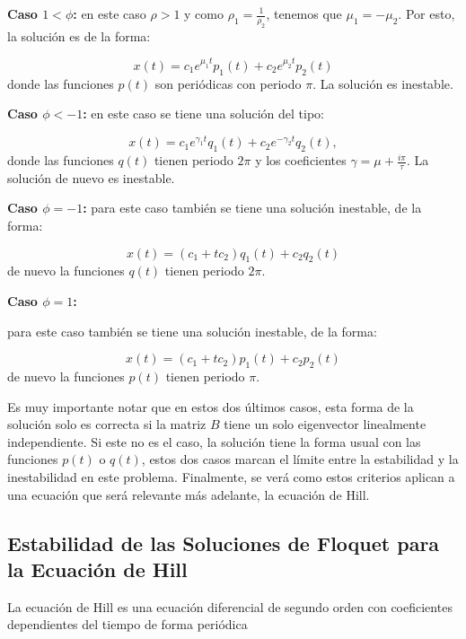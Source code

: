 \documentclass[10pt,a4paper]{report}
\begin{document}
\textbf{Caso $1 < \phi$:} en este caso $\rho > 1$ y como $\rho_1 = \frac{1}{\rho_2}$, tenemos que $\mu_1 = -\mu_2$. Por esto, la solución es de la forma:

\begin{equation}
x(t) = c_1 e^{\mu_1 t}p_1(t) + c_2 e^{\mu_2 t}p_2(t)
\end{equation} donde las funciones $p(t)$ son periódicas con periodo $\pi$. La solución es inestable.

\textbf{Caso $\phi < -1$:} en este caso se tiene una solución del tipo:

\begin{equation}
x(t) =c_1 e^{\gamma_1 t}q_1(t) + c_2 e^{-\gamma_2 t}q_2(t),
\end{equation} donde las funciones $q(t)$ tienen periodo $2\pi$ y los coeficientes $\gamma = \mu + \frac{i\pi}{\tau}$. La solución de nuevo es inestable.

\textbf{Caso $\phi = -1$:} para este caso también se tiene una solución inestable, de la forma:

\begin{equation}
x(t) = (c_1 + tc_2)q_1(t) + c_2q_2(t)
\end{equation} de nuevo la funciones $q(t)$ tienen periodo $2\pi$.

\textbf{Caso $\phi = 1$:}

para este caso también se tiene una solución inestable, de la forma:

\begin{equation}
x(t) = (c_1 + tc_2)p_1(t) + c_2p_2(t)
\end{equation} de nuevo la funciones $p(t)$ tienen periodo $\pi$.

Es muy importante notar que en estos dos últimos casos, esta forma de la solución solo es correcta si la matriz $B$ tiene un solo eigenvector linealmente independiente. Si este no es el caso, la solución tiene la forma usual con las funciones $p(t)$ o $q(t)$, estos dos casos marcan el límite entre la estabilidad y la inestabilidad en este problema. Finalmente, se verá como estos criterios aplican a una ecuación que será relevante más adelante, la ecuación de Hill.

\subsection{Estabilidad de las Soluciones de Floquet para la Ecuación de Hill}

La ecuación de Hill es una ecuación diferencial de segundo orden con coeficientes dependientes del tiempo de forma periódica\cite{WardFT}
\end{document}
